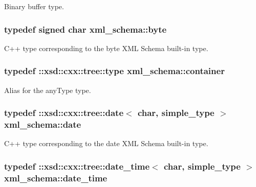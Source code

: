 Binary buffer type. 

\hypertarget{namespacexml__schema_a2a462724b41fb68016d13b34f9a84b7d}{
\subsubsection[{byte}]{\setlength{\rightskip}{0pt plus 5cm}typedef signed char {\bf xml\-\_\-schema\-::byte}}}\label{namespacexml__schema_a2a462724b41fb68016d13b34f9a84b7d}


C++ type corresponding to the byte X\-M\-L Schema built-\/in type. 

\hypertarget{namespacexml__schema_a395f5179c5fc4643909d66e9ff28d8ca}{
\subsubsection[{container}]{\setlength{\rightskip}{0pt plus 5cm}typedef \-::xsd\-::cxx\-::tree\-::type {\bf xml\-\_\-schema\-::container}}}\label{namespacexml__schema_a395f5179c5fc4643909d66e9ff28d8ca}


Alias for the any\-Type type. 

\hypertarget{namespacexml__schema_ad715e8c0fbf8ec80f67de561627f11bf}{
\subsubsection[{date}]{\setlength{\rightskip}{0pt plus 5cm}typedef \-::xsd\-::cxx\-::tree\-::date$<$ char, {\bf simple\-\_\-type} $>$ {\bf xml\-\_\-schema\-::date}}}\label{namespacexml__schema_ad715e8c0fbf8ec80f67de561627f11bf}


C++ type corresponding to the date X\-M\-L Schema built-\/in type. 

\hypertarget{namespacexml__schema_a4e3e937826b835b568d6a97bdaaf0804}{
\subsubsection[{date\-\_\-time}]{\setlength{\rightskip}{0pt plus 5cm}typedef \-::xsd\-::cxx\-::tree\-::date\-\_\-time$<$ char, {\bf simple\-\_\-type} $>$ {\bf xml\-\_\-schema\-::date\-\_\-time}}}\label{namespacexml__schema_a4e3e937826b835b568d6a97bdaaf0804}


